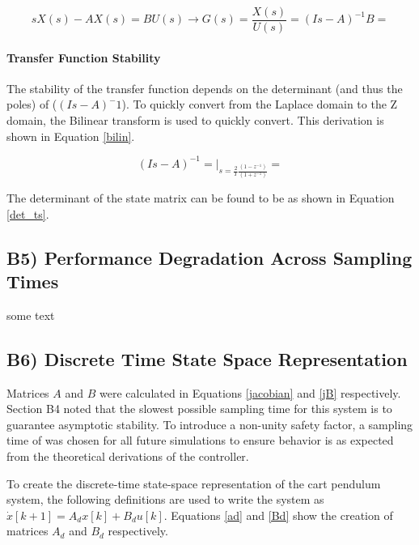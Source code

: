 \documentclass{article}
\begin{document}
\begin{equation}\label{acctf}
    sX(s)-AX(s)=BU(s)\rightarrow G(s)=\frac{X(s)}{U(s)}=(Is-A)^{-1}B= 
\end{equation}

\paragraph{Transfer Function Stability}
The stability of the transfer function depends on the determinant (and thus the poles) of ($(Is-A)^-1$). To quickly convert from the Laplace domain to the Z domain, the Bilinear transform is used to quickly convert. This derivation is shown in Equation \ref{bilin}.

\begin{equation}\label{bilin}
(Is-A)^{-1}=\left.  \right|_{s=\frac{2}{T} \frac{(1 - z^{-1})}{(1+z^{-1})}}=
\end{equation}

The determinant of the state matrix can be found to be as shown in Equation \ref{det_ts}.
\begin{equation}\label{det_ts}
    
\end{equation}



\subsection*{B5) Performance Degradation Across Sampling Times}

some text

\subsection*{B6) Discrete Time State Space Representation}
Matrices $A$ and $B$ were calculated in Equations \ref{jacobian} and \ref{jB} respectively. Section B4 noted that the slowest possible sampling time for this system is to guarantee asymptotic stability. To introduce a non-unity safety factor, a sampling time of  was chosen for all future simulations to ensure behavior is as expected from the theoretical derivations of the controller.

To create the discrete-time state-space representation of the cart pendulum system, the following definitions are used to write the system as $\dot x[k+1]=A_dx[k]+B_du[k]$. Equations \ref{ad} and \ref{Bd} show the creation of matrices $A_d$ and $B_d$ respectively.
\end{document}
